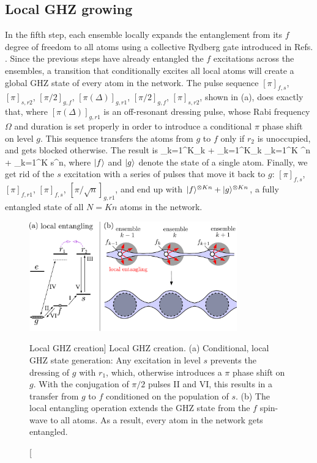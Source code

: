 \subsection{Local GHZ growing}
In the fifth step, each ensemble locally expands the entanglement from its $f$
degree of freedom to all atoms using a collective Rydberg gate introduced in
Refs.
\cite{Saffman2009, Weimer2010}.
Since the previous steps have already entangled the $f$ excitations across the
ensembles, a transition that conditionally excites all local atoms will create a
global GHZ state of every atom in the network. The pulse sequence $[\pi]_{f,s}$,
$[\pi]_{s,r2}$, $[\pi/2]_{g,f}$, $[\pi(\Delta)]_{g,r1}$, $[\pi/2]_{g,f}$,
$[\pi]_{s,r2}$, shown in (a),  does exactly that, where
$[\pi(\Delta)]_{g,r1}$ is an off-resonant dressing pulse, whose Rabi frequency
$\Omega$ and duration is set properly in order to introduce a conditional $\pi$
phase shift on level $g$.
This sequence transfers the atoms from $g$ to $f$ only if $r_2$ is unoccupied,
and gets blocked otherwise. The result is
\bel
\label{eq:step5}
	\bigotimes_{k=1}^K_k  + \bigotimes_{k=1}^K_k
	\;\rightarrow\; \bigotimes_{k=1}^K ^{\otimes n} + \bigotimes_{k=1}^K
	s\+^{\otimes n},
\eel
where $| f \rangle$ and $| g \rangle$ denote the state of a single atom.
Finally, we get rid of
the $s$ excitation with a series of pulses that move it back to $g$:
$[\pi]_{f,s}$, $[\pi]_{f,r1}$, $[\pi]_{f,s}$, $[\pi/\sqrt{n}]_{g,r1}$, and end
up with $| f \rangle^{\otimes Kn} + | g \rangle^{\otimes Kn}$, a fully entangled state
of all $N = Kn$ atoms in the network. 
\begin{figure}
\centering
\includegraphics[width=0.8\textwidth]{./figs_Komar2015/GHZ_2.pdf}
\caption
[Local GHZ creation]
{  
\label{fig:GHZ}
Local GHZ creation.
(a) Conditional,
local GHZ state generation: Any excitation in level $s$ prevents the dressing of
$g$ with $r_1$, which, otherwise introduces a $\pi$ phase shift on $g$. With the
conjugation of $\pi/2$ pulses II and VI, this results in a transfer
from $g$ to $f$ conditioned on the population of $s$. (b) The local entangling
operation extends the GHZ state from the $f$ spin-wave to all atoms. As a result, every atom in the network gets entangled. }
\end{figure}

